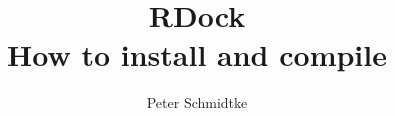 \documentclass[9pt,a4paper]{article}
\begin{document}
\cleardoublepage

	\title{RDock\\ How to install and compile}
	\author{Peter Schmidtke}
	\maketitle
	   \thispagestyle{empty}
	\cleardoublepage

\setcounter{page}{1}
\tableofcontents %
%
\end{document}
